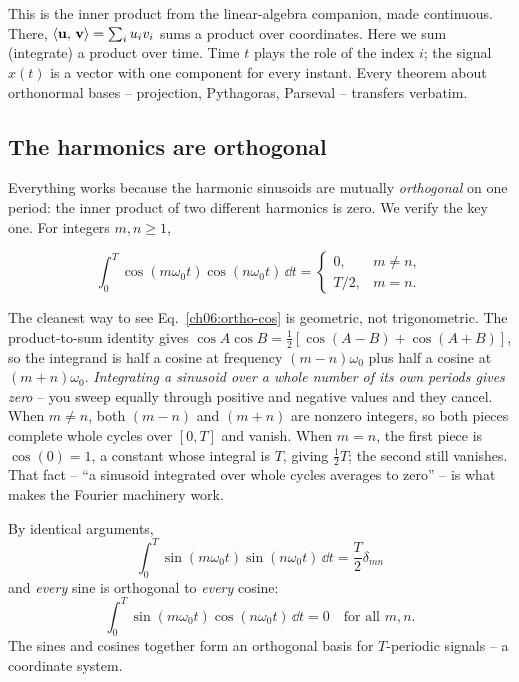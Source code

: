 \begin{connectionbox}
This is the inner product from the linear-algebra companion, made continuous. There,
\(\langle \mathbf{u},\, \mathbf{v} \rangle = \sum_i u_i v_i\) sums a product over coordinates. Here we sum
(integrate) a product over time. Time \(t\) plays the role of the index \(i\); the signal
\(x(t)\) is a vector with one component for every instant. Every theorem about
orthonormal bases -- projection, Pythagoras, Parseval -- transfers verbatim.
\end{connectionbox}

\subsection{The harmonics are orthogonal}

Everything works because the harmonic sinusoids are mutually \emph{orthogonal} on one
period: the inner product of two different harmonics is zero. We verify the key one.
For integers \(m,n \ge 1\),

\begin{equation}
\int_{0}^{T}\cos(m\omega_0 t)\cos(n\omega_0 t)\,\dd t
= \begin{cases} 0, & m\ne n,\\[2pt] T/2, & m=n. \end{cases}
\label{ch06:ortho-cos}
\end{equation}

\begin{whybox}
The cleanest way to see Eq.~\eqref{ch06:ortho-cos} is geometric, not trigonometric. The
product-to-sum identity gives
\(\cos A\cos B = \tfrac12[\cos(A-B) + \cos(A+B)]\), so the integrand is half a cosine at
frequency \((m-n)\omega_0\) plus half a cosine at \((m+n)\omega_0\). \emph{Integrating a
sinusoid over a whole number of its own periods gives zero} -- you sweep equally through
positive and negative values and they cancel. When \(m\ne n\), both \((m-n)\) and
\((m+n)\) are nonzero integers, so both pieces complete whole cycles over \([0,T]\) and
vanish. When \(m=n\), the first piece is \(\cos(0)=1\), a constant whose integral is
\(T\), giving \(\tfrac12 T\); the second still vanishes. That fact -- ``a sinusoid
integrated over whole cycles averages to zero'' -- is what makes the Fourier
machinery work.
\end{whybox}

By identical arguments,
\[
\int_0^T \sin(m\omega_0 t)\sin(n\omega_0 t)\,\dd t = \frac{T}{2}\delta_{mn}
\]
and \emph{every} sine is orthogonal to \emph{every} cosine:
\[
\int_0^T \sin(m\omega_0 t)\cos(n\omega_0 t)\,\dd t = 0 \quad \text{for all } m,n.
\] The sines and
cosines together form an orthogonal basis for $T$-periodic signals -- a coordinate system.

